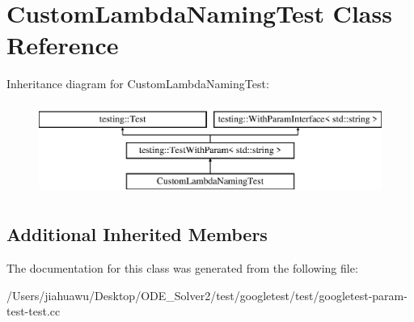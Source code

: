 \hypertarget{class_custom_lambda_naming_test}{}\section{Custom\+Lambda\+Naming\+Test Class Reference}
\label{class_custom_lambda_naming_test}
Inheritance diagram for Custom\+Lambda\+Naming\+Test\+:\begin{figure}[H]
\begin{center}
\leavevmode
\includegraphics[height=3.000000cm]{class_custom_lambda_naming_test}
\end{center}
\end{figure}
\subsection*{Additional Inherited Members}


The documentation for this class was generated from the following file\+:\begin{DoxyCompactItemize}
\item 
/\+Users/jiahuawu/\+Desktop/\+O\+D\+E\+\_\+\+Solver2/test/googletest/test/googletest-\/param-\/test-\/test.\+cc\end{DoxyCompactItemize}
